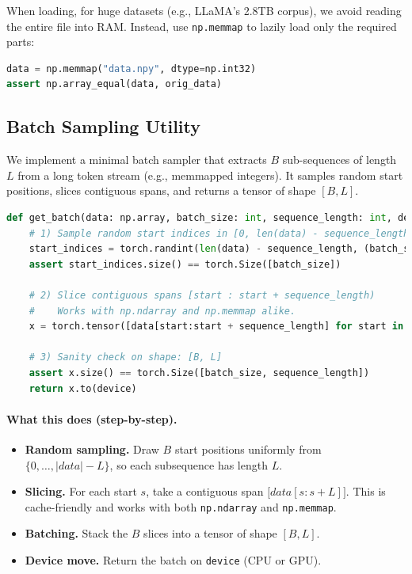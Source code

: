 When loading, for huge datasets (e.g., LLaMA's 2.8TB corpus), we avoid reading the entire file into RAM.  
Instead, use \texttt{np.memmap} to lazily load only the required parts:
\begin{lstlisting}[language=Python]
data = np.memmap("data.npy", dtype=np.int32)
assert np.array_equal(data, orig_data)
\end{lstlisting}

\clearpage
\subsection{Batch Sampling Utility}

We implement a minimal batch sampler that extracts $B$ sub-sequences of length $L$ from a long token stream (e.g., memmapped integers). It samples random start positions, slices contiguous spans, and returns a tensor of shape $[B, L]$.

\begin{lstlisting}[language=Python]
def get_batch(data: np.array, batch_size: int, sequence_length: int, device: str) -> torch.Tensor:
    # 1) Sample random start indices in [0, len(data) - sequence_length)
    start_indices = torch.randint(len(data) - sequence_length, (batch_size,))
    assert start_indices.size() == torch.Size([batch_size])

    # 2) Slice contiguous spans [start : start + sequence_length)
    #    Works with np.ndarray and np.memmap alike.
    x = torch.tensor([data[start:start + sequence_length] for start in start_indices])

    # 3) Sanity check on shape: [B, L]
    assert x.size() == torch.Size([batch_size, sequence_length])
    return x.to(device)
\end{lstlisting}

\paragraph{What this does (step-by-step).}
\begin{itemize}
  \item \textbf{Random sampling.} Draw $B$ start positions uniformly from 
        $\{0,\dots,|data|-L\}$, so each subsequence has length $L$.
  \item \textbf{Slicing.} For each start $s$, take a contiguous span 
        \(\big[data[s : s+L]\big]\). This is cache-friendly and works with both
        \texttt{np.ndarray} and \texttt{np.memmap}.
  \item \textbf{Batching.} Stack the $B$ slices into a tensor of shape \([B, L]\).
  \item \textbf{Device move.} Return the batch on \texttt{device} (CPU or GPU).
\end{itemize}

